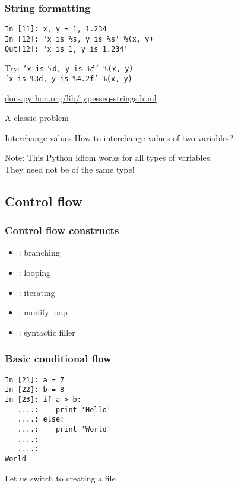 \documentclass[14pt,compress]{beamer}
\newcounter{time}
\newcommand{\inctime}[1]{\addtocounter{time}{#1}{\tiny \thetime\ m}}
\newcommand{\kwrd}[1]{ \texttt{\textbf{\color{blue}{#1}}}  }
\begin{document}
\begin{frame}[fragile]\frametitle{String formatting}
  \begin{lstlisting}
In [11]: x, y = 1, 1.234
In [12]: 'x is %s, y is %s' %(x, y)
Out[12]: 'x is 1, y is 1.234'
  \end{lstlisting}
  \begin{block}{Try:}
    \texttt{'x is \%d, y is \%f' \%(x, y) }\\
    \texttt{'x is \%3d, y is \%4.2f' \%(x, y) }
  \end{block}
  \small
\url{docs.python.org/lib/typesseq-strings.html}\\
\end{frame}

\begin{frame}
  {A classic problem}
  \begin{block}
    {Interchange values}
    How to interchange values of two variables? 
  \end{block}
  \pause
  \begin{block}{Note:}
    This Python idiom works for all types of variables.\\
They need not be of the same type!
  \end{block}
  \inctime{30}
\end{frame}


\subsection{Control flow}
\begin{frame}
  \frametitle{Control flow constructs}  
  \begin{itemize}
  \item \kwrd{if/elif/else}: branching
  \item \kwrd{while}: looping
  \item \kwrd{for}: iterating 
  \item \kwrd{break, continue}: modify loop 
  \item \kwrd{pass}: syntactic filler
  \end{itemize}
\end{frame}

\begin{frame}[fragile]
  \frametitle{Basic conditional flow}
  \begin{lstlisting}
In [21]: a = 7
In [22]: b = 8
In [23]: if a > b:
   ....:    print 'Hello'
   ....: else:
   ....:    print 'World'
   ....:
   ....:
World
  \end{lstlisting}
  Let us switch to creating a file
\end{frame}
\end{document}
